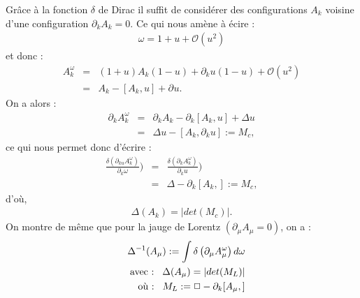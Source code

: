 \documentclass[a4paper,11pt]{article} %
\theoremstyle{plain}
\theoremstyle{definition}
\theoremstyle{remark}
\numberwithin{equation}{section}
\numberwithin{equation}{subsection}
\numberwithin{figure}{section}
\begin{document}
Grâce à la fonction $\delta$ de Dirac il suffit de considérer des configurations $A_{k}$ voisine d'une configuration $\partial_{k} A_{k} = 0$. 
Ce qui nous amène à écire : 
\begin{eqnarray*}
\omega = 1+ u + \mathcal{O}(u^2)
\end{eqnarray*}
et donc :
\begin{eqnarray*}
  A^{\omega}_{k} &=& (1+u)A_{k}(1-u) + \partial_{k}u (1-u)+ \mathcal{O}(u^2) \\
                   &=& A_{k} - [A_{k},u] + \partial_{}u  . 
\end{eqnarray*}
On a alors :
\begin{eqnarray*}
  \partial_{k}A^{\omega}_{k} &=& \partial_{k}A_{k} - \partial_{k}[A_{k},u] + \Delta u \\
			         &=& \Delta u - [A_{k},\partial_{k}u] := M_{c} ,
\end{eqnarray*}
ce qui nous permet donc d'écrire :
\begin{eqnarray*}
 \frac {\delta(\partial_{ku}A^{\omega}_{k})}{\partial_{k}\omega}) &=& \frac {\delta(\partial_{k}A^{\omega}_{k})}{\partial_{k}u})\\
                                                                       &=& \Delta - \partial_{k}[A_{k},] := M_{c}  ,
\end{eqnarray*}
d'où,
\begin{eqnarray*}
 \Delta(A_{k}) = \left|det(M_{c})\right|  .
\end{eqnarray*}
On montre de même que pour la jauge de Lorentz $(\partial_{\mu} A_{\mu} = 0)$, on a :
\begin{eqnarray*}
 && \Delta^{-1}(A_{\mu}):= \int \delta \left(\partial_{\mu}A^{\omega}_{\mu}\right)d\omega \\
 && \text{avec :} \hspace{3mm} \Delta(A_{\mu}) = \left|det(M_{L})\right| \\
 && \text{où :} \hspace{3mm} M_{L} := \Box - \partial_{k}[A_{\mu},]
\end{eqnarray*}
\end{document}
